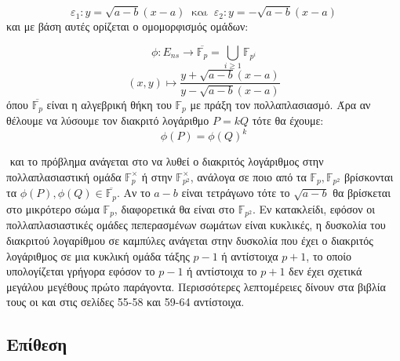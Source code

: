 \documentclass[oneside,a4paper]{article}
\begin{document}
$$\varepsilon_1 : y = \sqrt{a-b}(x-a) \ \text{ και } \ \varepsilon_2 : y=-\sqrt{a-b}(x-a)$$ και με βάση αυτές ορίζεται ο ομομορφισμός ομάδων:

$$\phi : E_{ns} \longrightarrow \overline{\mathbb{F}_p} = \bigcup\limits_{i\geq 1} \mathbb{F}_{p^i}$$
$$(x,y) \longmapsto \frac{y+\sqrt{a-b}(x-a)}{y-\sqrt{a-b}(x-a)}$$ όπου $\overline{\mathbb{F}_p}$ είναι η αλγεβρική θήκη του $\mathbb{F}_p$ με πράξη τον πολλαπλασιασμό. Άρα αν θέλουμε να λύσουμε τον διακριτό λογάριθμο $P = kQ$ τότε θα έχουμε:
$$\phi(P)=\phi(Q)^k$$

$ $\newline
και το πρόβλημα ανάγεται στο να λυθεί ο διακριτός λογάριθμος στην πολλαπλασιαστική ομάδα $\mathbb{F}^{\times}_p$ ή στην $\mathbb{F}^{\times}_{p^2}$, ανάλογα σε ποιο από τα $\mathbb{F}_p, \mathbb{F}_{p^2}$ βρίσκονται τα $\phi(P),\phi(Q) \in \overline{\mathbb{F}_p}$. Αν το $a-b$ είναι τετράγωνο τότε το $\sqrt{a-b}$ θα βρίσκεται στο μικρότερο σώμα $\mathbb{F}_p$, διαφορετικά θα είναι στο $\mathbb{F}_{p^2}$. Εν κατακλείδι, εφόσον οι πολλαπλασιαστικές ομάδες πεπερασμένων σωμάτων είναι κυκλικές, η δυσκολία του διακριτού λογαρίθμου σε  καμπύλες ανάγεται στην δυσκολία που έχει ο διακριτός λογάριθμος σε μια κυκλική ομάδα τάξης $p-1$ ή αντίστοιχα $p+1$, το οποίο υπολογίζεται γρήγορα εφόσον το $p-1$ ή αντίστοιχα το $p+1$ δεν έχει σχετικά μεγάλου μεγέθους πρώτο παράγοντα.  
Περισσότερες λεπτομέρειες δίνουν στα βιβλία τους οι  \cite{silverman} και  \cite{washington} στις σελίδες 55-58 και 59-64 αντίστοιχα.




\subsection{Επίθεση }
\end{document}

